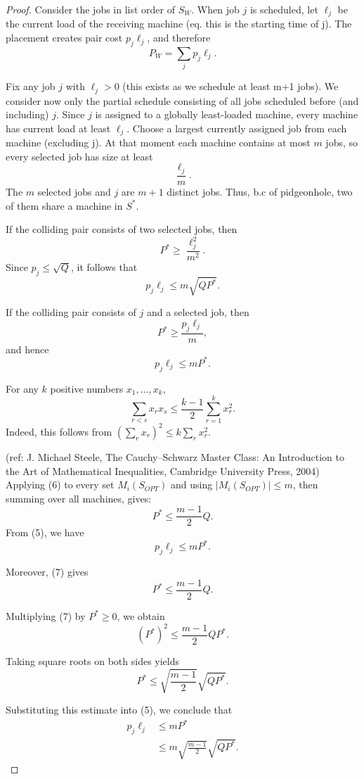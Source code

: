 \documentclass[11pt]{article}
\begin{document}
\begin{proof}
Consider the jobs in list order of $S_W$.  When job \(j\) is scheduled, let \(\ell_j\)
be the current load of the receiving machine (eq. this is the starting time of j).  The placement creates pair
cost \(p_j\ell_j\), and therefore
\[
 P_{W}=\sum_jp_j\ell_j.
\]

Fix any job \(j\) with \(\ell_j>0\) (this exists as we schedule at least m+1 jobs). 
We consider now only the partial schedule consisting of all jobs scheduled before 
(and including) $j$.
Since $j$ is assigned to a globally least-loaded machine,
every machine has current load at least \(\ell_j\).
Choose a largest currently assigned job from each machine (excluding j).  At that moment
each machine contains at most \(m\) jobs, so every selected job has size at
least
\[
 \frac{\ell_j}{m}.
\]
The \(m\) selected jobs and \(j\) are \(m+1\) distinct jobs.  Thus, b.c of pidgeonhole, 
two of them share a machine in $S^*$.

If the colliding pair consists of two selected jobs, then
\[
 P^*\ge\frac{\ell_j^2}{m^2}.
\]
Since \(p_j\le\sqrt Q\), it follows that
\[
 p_j\ell_j\le m\sqrt{QP^*}.
\tag{4}
\]

If the colliding pair consists of \(j\) and a selected job, then
\[
 P^*\ge\frac{p_j\ell_j}{m},
\]
and hence
\[
 p_j\ell_j\le mP^*.
\tag{5}
\]

For any \(k\) positive numbers \(x_1,\ldots,x_k\),
\[
 \sum_{r<s}x_rx_s
 \le \frac{k-1}{2}\sum_{r=1}^kx_r^2.
\tag{6}
\]
Indeed, this follows from
\((\sum_rx_r)^2\le k\sum_rx_r^2\).

(ref: J. Michael Steele, The Cauchy–Schwarz Master Class: An Introduction to the Art of Mathematical Inequalities, Cambridge University Press, 2004)
Applying (6) to every  set $M_{i}(S_{OPT})$ and using $|M_{i}(S_{OPT})|\le m$, then summing over all machines, gives: 
\[
 P^*\le\frac{m-1}{2}Q.
\tag{7}
\]
From (5), we have
\[
p_j\ell_j \le mP^*.
\]

Moreover, (7) gives
\[
P^* \le \frac{m-1}{2}Q.
\]

Multiplying (7) by \(P^*\ge 0\), we obtain
\[
(P^*)^2
\le
\frac{m-1}{2}QP^*.
\]

Taking square roots on both sides yields
\[
P^*
\le
\sqrt{\frac{m-1}{2}}\sqrt{QP^*}.
\]

Substituting this estimate into (5), we conclude that
\[
\begin{aligned}
p_j\ell_j
&\le mP^*\\
&\le
m\sqrt{\frac{m-1}{2}}\sqrt{QP^*}.
\end{aligned}
\tag{8}
\]


\end{proof}
\end{document}
